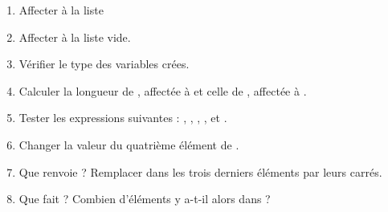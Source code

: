 \begin{enumerate}[label = \emph{\alph*)}]
  \item Affecter à  la liste \pyv{[2,5,3,-1,7,2,1]}
  \item Affecter à  la liste vide.
  \item Vérifier le type des variables crées.
  \item Calculer la longueur de , affectée à  et celle de , affectée à .
  \item Tester les expressions suivantes : , , , ,  et .
  \item Changer la valeur du quatrième élément de .
  \item Que renvoie  ? Remplacer dans  les trois derniers éléments par leurs carrés.
  \item Que fait  ? Combien d'éléments y a-t-il alors dans  ?
\end{enumerate}